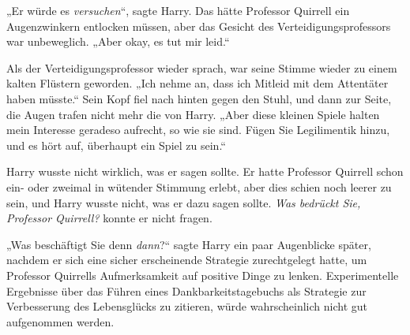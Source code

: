 „Er würde es \emph{versuchen}“, sagte Harry. Das hätte Professor Quirrell ein Augenzwinkern entlocken müssen, aber das Gesicht des Verteidigungsprofessors war unbeweglich. „Aber okay, es tut mir leid.“

Als der Verteidigungsprofessor wieder sprach, war seine Stimme wieder zu einem kalten Flüstern geworden. „Ich nehme an, dass ich Mitleid mit dem Attentäter haben müsste.“ Sein Kopf fiel nach hinten gegen den Stuhl, und dann zur Seite, die Augen trafen nicht mehr die von Harry. „Aber diese kleinen Spiele halten mein Interesse geradeso aufrecht, so wie sie sind. Fügen Sie Legilimentik hinzu, und es hört auf, überhaupt ein Spiel zu sein.“

Harry wusste nicht wirklich, was er sagen sollte. Er hatte Professor Quirrell schon ein- oder zweimal in wütender Stimmung erlebt, aber dies schien noch leerer zu sein, und Harry wusste nicht, was er dazu sagen sollte. \emph{Was bedrückt Sie, Professor Quirrell?} konnte er nicht fragen.

„Was beschäftigt Sie denn \emph{dann}?“ sagte Harry ein paar Augenblicke später, nachdem er sich eine sicher erscheinende Strategie zurechtgelegt hatte, um Professor Quirrells Aufmerksamkeit auf positive Dinge zu lenken. Experimentelle Ergebnisse über das Führen eines Dankbarkeitstagebuchs als Strategie zur Verbesserung des Lebensglücks zu zitieren, würde wahrscheinlich nicht gut aufgenommen werden.

